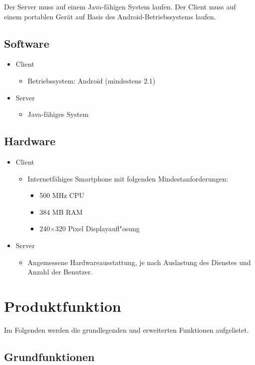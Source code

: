 \documentclass[a4paper,10pt]{scrartcl}
\begin{document}
Der Server muss auf einem Java-fähigen System laufen.
Der Client muss auf einem portablen Gerät auf Basis des Android-Betriebssystems laufen.

\subsection{Software}
\begin{itemize}
\item Client
   \begin{itemize}
      \item Betriebssystem: Android (mindestens 2.1)
   \end{itemize}
\item Server
   \begin{itemize}
      \item Java-fähiges System
   \end{itemize}
\end{itemize}

\subsection{Hardware}
\begin{itemize}
\item Client
   \begin{itemize}
      \item Internetfähiges Smartphone mit folgenden Mindestanforderungen:
         \begin{itemize}
         \item 500 MHz CPU
         \item 384 MB RAM
         \item 240$\times$320 Pixel Displayaufl"osung
      \end{itemize}
   \end{itemize}
\item Server
   \begin{itemize}
      \item Angemessene Hardwareausstattung, je nach Auslastung des Dienstes und
            Anzahl der Benutzer.
   \end{itemize}
\end{itemize}

\section{Produktfunktion}
Im Folgenden werden die grundlegenden und erweiterten Funktionen aufgelistet.
\subsection{Grundfunktionen}
\end{document}
